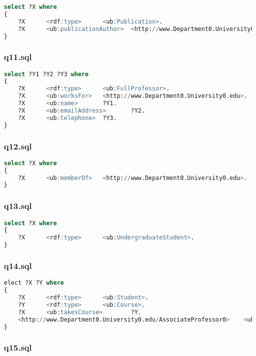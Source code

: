 \documentclass[titlepage, a4paper, 12pt] {article}
\begin{document}
\begin{lstlisting}[language=SQL]
select ?X where
{
	?X      <rdf:type>      <ub:Publication>.
	?X      <ub:publicationAuthor>  <http://www.Department0.University0.edu/AssistantProfessor0>.
}
\end{lstlisting}

\subsubsection{q11.sql}

\begin{lstlisting}[language=SQL]
select ?Y1 ?Y2 ?Y3 where
{
	?X      <rdf:type>      <ub:FullProfessor>.
	?X      <ub:worksFor>   <http://www.Department0.University0.edu>.
	?X      <ub:name>       ?Y1.
	?X      <ub:emailAddress>       ?Y2.
	?X      <ub:telephone>  ?Y3.
}
\end{lstlisting}

\subsubsection{q12.sql}

\begin{lstlisting}[language=SQL]
select ?X where
{
	?X      <ub:memberOf>   <http://www.Department0.University0.edu>.
}
\end{lstlisting}

\subsubsection{q13.sql}

\begin{lstlisting}[language=SQL]
select ?X where
{
	?X      <rdf:type>      <ub:UndergraduateStudent>.
}
\end{lstlisting}

\subsubsection{q14.sql}

\begin{lstlisting}[language=SQL]
elect ?X ?Y where
{
	?X      <rdf:type>      <ub:Student>.
	?Y      <rdf:type>      <ub:Course>.
	?X      <ub:takesCourse>        ?Y.
	<http://www.Department0.University0.edu/AssociateProfessor0>    <ub:teacherOf>  ?Y.
}
\end{lstlisting}

\subsubsection{q15.sql}
\end{document}
